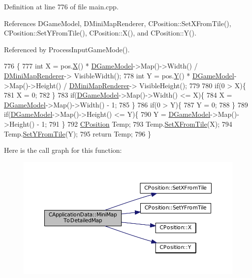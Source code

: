 Definition at line 776 of file main.\+cpp.



References D\+Game\+Model, D\+Mini\+Map\+Renderer, C\+Position\+::\+Set\+X\+From\+Tile(), C\+Position\+::\+Set\+Y\+From\+Tile(), C\+Position\+::\+X(), and C\+Position\+::\+Y().



Referenced by Process\+Input\+Game\+Mode().


\begin{DoxyCode}
776                                                                     \{
777     \textcolor{keywordtype}{int} X = pos.\hyperlink{classCPosition_a9a6b94d3b91df1492d166d9964c865fc}{X}() * \hyperlink{classCApplicationData_a32b50c7c1cbac3cfd67c7f775b1d6fee}{DGameModel}->Map()->Width() / \hyperlink{classCApplicationData_a59b0f5dfe30ed5a54dd28aee98109e34}{DMiniMapRenderer}->
      VisibleWidth();
778     \textcolor{keywordtype}{int} Y = pos.\hyperlink{classCPosition_a1aa8a30e2f08dda1f797736ba8c13a87}{Y}() * \hyperlink{classCApplicationData_a32b50c7c1cbac3cfd67c7f775b1d6fee}{DGameModel}->Map()->Height() / \hyperlink{classCApplicationData_a59b0f5dfe30ed5a54dd28aee98109e34}{DMiniMapRenderer}->
      VisibleHeight();
779     
780     \textcolor{keywordflow}{if}(0 > X)\{
781         X = 0;    
782     \}
783     \textcolor{keywordflow}{if}(\hyperlink{classCApplicationData_a32b50c7c1cbac3cfd67c7f775b1d6fee}{DGameModel}->Map()->Width() <= X)\{
784         X = \hyperlink{classCApplicationData_a32b50c7c1cbac3cfd67c7f775b1d6fee}{DGameModel}->Map()->Width() - 1;   
785     \}
786     \textcolor{keywordflow}{if}(0 > Y)\{
787         Y = 0;    
788     \}
789     \textcolor{keywordflow}{if}(\hyperlink{classCApplicationData_a32b50c7c1cbac3cfd67c7f775b1d6fee}{DGameModel}->Map()->Height() <= Y)\{
790         Y = \hyperlink{classCApplicationData_a32b50c7c1cbac3cfd67c7f775b1d6fee}{DGameModel}->Map()->Height() - 1;   
791     \}
792     \hyperlink{classCPosition}{CPosition} Temp;
793     Temp.\hyperlink{classCPosition_ac6a1eeaeb98e20942efea7cf253b2ec4}{SetXFromTile}(X);
794     Temp.\hyperlink{classCPosition_a4be1caa5ce58297e9d371f6bc1db32d9}{SetYFromTile}(Y);
795     \textcolor{keywordflow}{return} Temp;
796 \}
\end{DoxyCode}
Here is the call graph for this function\+:\nopagebreak
\begin{figure}[H]
\begin{center}
\leavevmode
\includegraphics[width=350pt]{classCApplicationData_a3dabde94ddec0eb2c732525f54164bc5_cgraph}
\end{center}
\end{figure}
